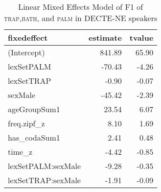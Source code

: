 \begin{table}[ht]
\centering
\begin{tabular}{lrr}
  \hline
fixedeffect & estimate & tvalue \\ 
  \hline
(Intercept) & 841.89 & 65.90 \\ 
  lexSetPALM & -70.43 & -4.26 \\ 
  lexSetTRAP & -0.90 & -0.07 \\ 
  sexMale & -45.42 & -2.39 \\ 
  ageGroupSum1 & 23.54 & 6.07 \\ 
  freq.zipf\_z & 8.10 & 1.69 \\ 
  has\_codaSum1 & 2.41 & 0.48 \\ 
  time\_z & -4.42 & -0.85 \\ 
  lexSetPALM:sexMale & -9.28 & -0.35 \\ 
  lexSetTRAP:sexMale & -1.91 & -0.09 \\ 
   \hline
\end{tabular}
\caption{Linear Mixed Effects Model of F1 of \textsc{trap},\textsc{bath}, and \textsc{palm} in DECTE-NE speakers \label{tbl:TBPF1DE}} 
\end{table}
